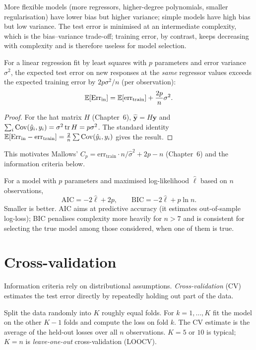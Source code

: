 More flexible models (more regressors, higher-degree polynomials, smaller regularisation) have lower bias but higher variance; simple models have high bias but low variance. The test error is minimised at an intermediate complexity, which is the bias--variance trade-off; training error, by contrast, keeps decreasing with complexity and is therefore useless for model selection.

\begin{theorem}\label{thm:optimism}
For a linear regression fit by least squares with $p$ parameters and error variance $\sigma^2$, the expected test error on new responses at the \emph{same} regressor values exceeds the expected training error by $2p\sigma^2/n$ (per observation):
\[ \mathbb{E}[\mathrm{Err}_{\mathrm{in}}]=\mathbb{E}[\mathrm{err}_{\mathrm{train}}]+\frac{2p}n\sigma^2. \]
\end{theorem}

\begin{proof}
For the hat matrix $H$ (Chapter~6), $\hat{\mathbf{y}}=H\mathbf{y}$ and $\sum_i\operatorname{Cov}(\hat{y}_i,y_i)=\sigma^2\operatorname{tr} H=p\sigma^2$. The standard identity $\mathbb{E}[\mathrm{Err}_{\mathrm{in}}-\mathrm{err}_{\mathrm{train}}]=\frac2n\sum\operatorname{Cov}(\hat{y}_i,y_i)$ gives the result.
\end{proof}

This motivates Mallows' $C_p=\mathrm{err}_{\mathrm{train}}\cdot n/\hat\sigma^2+2p-n$ (Chapter~6) and the information criteria below.

\begin{definition}
For a model with $p$ parameters and maximised log-likelihood $\hat\ell$ based on $n$ observations,
\[ \mathrm{AIC}=-2\hat\ell+2p,\qquad\mathrm{BIC}=-2\hat\ell+p\ln n. \]
Smaller is better. AIC aims at predictive accuracy (it estimates out-of-sample log-loss); BIC penalises complexity more heavily for $n>7$ and is consistent for selecting the true model among those considered, when one of them is true.
\end{definition}

\section{Cross-validation}

Information criteria rely on distributional assumptions. \emph{Cross-validation} (CV) estimates the test error directly by repeatedly holding out part of the data.

\begin{definition}
Split the data randomly into $K$ roughly equal folds. For $k=1,\dots,K$ fit the model on the other $K-1$ folds and compute the loss on fold $k$. The CV estimate is the average of the held-out losses over all $n$ observations. $K=5$ or $10$ is typical; $K=n$ is \emph{leave-one-out} cross-validation (LOOCV).
\end{definition}

